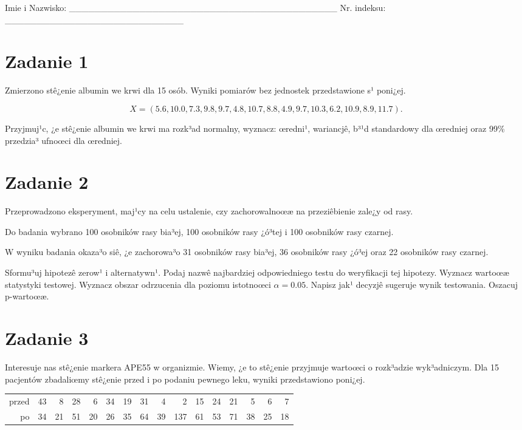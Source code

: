\documentclass[a4paper,12pt]{article}
\begin{document}
 Imie i Nazwisko: \_\_\_\_\_\_\_\_\_\_\_\_\_\_\_\_\_\_\_\_\_\_\_\_\_\_\_\_\_\_\_\_\_\_\_\_\_\_\_\_\_\_ Nr. indeksu: \_\_\_\_\_\_\_\_\_\_\_\_\_\_\_\_\_\_\_\_\_\_\_\_\_\_\_\_ 
 \section*{Zadanie 1}
     
     Zmierzono stê¿enie albumin we krwi dla 15 osób. 
     Wyniki pomiarów bez jednostek przedstawione s¹ poni¿ej. 
     
     \noindent $$X=(  5.6, 10.0,  7.3,  9.8,  9.7,  4.8, 10.7,  8.8,  4.9,  9.7, 10.3,  6.2, 10.9,  8.9, 11.7 ).$$
     
     Przyjmuj¹c, ¿e stê¿enie albumin we krwi ma rozk³ad normalny, 
     wyznacz: œredni¹, wariancjê, b³¹d standardowy dla œredniej oraz 99\% przedzia³ ufnoœci dla œredniej. \vspace{1cm} 

  \section*{Zadanie 2}
     
  Przeprowadzono eksperyment, maj¹cy na celu ustalenie, czy zachorowalnoœæ na przeziêbienie zale¿y od rasy.
  
  Do badania wybrano 100 osobników rasy bia³ej, 100 osobników rasy ¿ó³tej i 100 osobników rasy czarnej. 
  
  W wyniku badania okaza³o siê, ¿e zachorowa³o 31 osobników rasy bia³ej, 36 osobników rasy ¿ó³ej oraz 22 osobników rasy czarnej. 
  
  Sformu³uj hipotezê zerow¹ i alternatywn¹. 
  Podaj nazwê najbardziej odpowiedniego testu do weryfikacji tej hipotezy. 
  Wyznacz wartoœæ statystyki testowej. 
  Wyznacz obszar odrzucenia dla poziomu istotnoœci $\alpha=0.05$. 
  Napisz jak¹ decyzjê sugeruje wynik testowania. Oszacuj p-wartoœæ. \vspace{1cm} 

  \section*{Zadanie 3}
     
  Interesuje nas stê¿enie markera APE55  w organizmie. 
  Wiemy, ¿e to stê¿enie przyjmuje wartoœci o rozk³adzie wyk³adniczym. 
  Dla 15 pacjentów zbadaliœmy stê¿enie przed i po podaniu pewnego leku, 
  wyniki przedstawiono poni¿ej.
  
  \vspace{0.5cm} 
  \noindent\begin{center} 
\begin{tabular}{rrrrrrrrrrrrrrrr}
  \hline
  \hline
przed & 43 & 8 & 28 & 6 & 34 & 19 & 31 & 4 & 2 & 15 & 24 & 21 & 5 & 6 & 7 \\
  po & 34 & 21 & 51 & 20 & 26 & 35 & 64 & 39 & 137 & 61 & 53 & 71 & 38 & 25 & 18 \\
   \hline
\end{tabular}
 
  \end{center} 
  \vspace{0.5cm}
  
\end{document}
